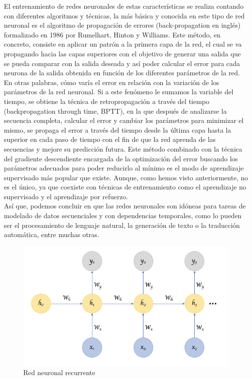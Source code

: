 El entrenamiento de redes neuronales de estas características se realiza contando con diferentes algoritmos y técnicas, la más básica y conocida en este tipo de red neuronal es el algoritmo de propagación de errores (back-propagation en inglés) formalizado en 1986 por Rumelhart, Hinton y Williams. Este método, en concreto, consiste en aplicar un patrón a la primera capa de la red, el cual se va propagando hacia las capas superiores con el objetivo de generar una salida que se pueda comparar con la salida deseada y así poder calcular el error para cada neurona de la salida obtenida en función de los diferentes parámetros de la red. En otras palabras, cómo varía el error en relación con la variación de los parámetros de la red neuronal. Si a este fenómeno le sumamos la variable del tiempo, se obtiene la técnica de retropropagación a través del tiempo (backpropagation through time, BPTT), en la que después de analizarse la secuencia completa, calcular el error y cambiar los parámetros para minimizar el mismo, se propaga el error a través del tiempo desde la última capa hasta la superior en cada paso de tiempo con el fin de que la red aprenda de las secuencias y mejore su predicción futura. 
Este método combinado con la técnica del gradiente descendiente encargada de la optimización del error buscando los parámetros adecuados para poder reducirlo al mínimo es el modo de aprendizaje supervisado más popular que existe.  Aunque, como hemos visto anteriormente, no es el único, ya que coexiste con técnicas de entrenamiento como el aprendizaje no supervisado y el aprendizaje por refuerzo. \\

Así que, podemos concluir en que las redes neuronales son idóneas para tareas de modelado de datos secuenciales y con dependencias temporales, como lo pueden ser el procesamiento de lenguaje natural, la generación de texto o la traducción automática, entre muchas otras.
\begin{figure}[h]
	\centering
	\includegraphics[width = 1 \textwidth]{Imagenes/Vectorial/recurrente.png}
	\caption{Red neuronal recurrente}
	\label{fig:rnn}
\end{figure}


